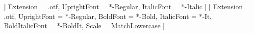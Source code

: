 \usepackage[
  letterpaper,
  landscape,
  includehead,
  includemp,
  margin = 1in,
  marginparwidth = 2.25in,
  marginparsep = 18pt,
  top = 0.5in,
  headheight = 15pt
]{geometry}

\usepackage{fancyhdr}
\pagestyle{fancyplain}
\fancyhf{}
\fancyhead[LE,RO]{\thepage}
\fancyhead[LO,RE]{\textsf{\leftmark}}
\renewcommand\sectionmark[1]{\markboth{#1}{}} %

\usepackage{fontspec}
\setmainfont{EBGaramond12}[
  Extension = .otf,
  UprightFont = *-Regular,
  ItalicFont = *-Italic
]
\setmonofont{SourceCodePro}[
  Extension = .otf,
  UprightFont = *-Regular,
  BoldFont = *-Bold,
  ItalicFont = *-It,
  BoldItalicFont = *-BoldIt,
  Scale = MatchLowercase
]

\usepackage[
  breaklinks,
  colorlinks,
  urlcolor=blue,
  citecolor=blue,
  linkcolor=blue
]{hyperref}

\usepackage[parfill]{parskip}

\usepackage{marginnote}
\renewcommand*{\marginfont}{\small}

\newcommand{\xnote}[1]{\def\x{\marginnote{#1}}}

